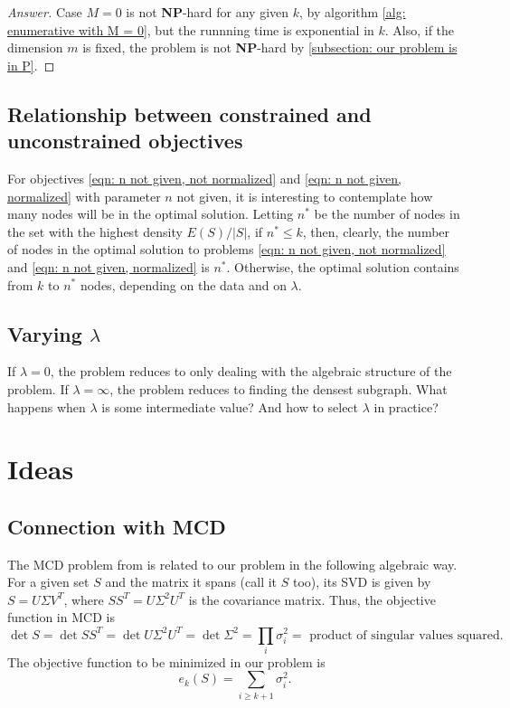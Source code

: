\documentclass{article}
\begin{document}
\begin{proof}[Answer]
Case $M=0$ is not \textbf{NP}-hard for any given $k$, by algorithm \ref{alg: enumerative with M = 0}, but the runnning time is exponential in $k$. Also, if the dimension $m$ is fixed, the problem is not \textbf{NP}-hard by \ref{subsection: our problem is in P}.
\end{proof}

\subsection{Relationship between constrained and unconstrained objectives}
For objectives \ref{eqn: n not given, not normalized} and \ref{eqn: n not given, normalized} with parameter $n$ not given, it is interesting to contemplate how many nodes will be in the optimal solution. Letting $n^*$ be the number of nodes in the set with the highest density $E(S)/|S|$,
if $n^* \leq k$, then, clearly, the number of nodes in the optimal solution to problems \ref{eqn: n not given, not normalized} and \ref{eqn: n not given, normalized} is $n^*$. Otherwise, the optimal solution contains from $k$ to $n^*$ nodes, depending on the data and on $\lambda$.

\subsection{Varying $\lambda$}
If $\lambda = 0$, the problem reduces to only dealing with the algebraic structure of the problem. If $\lambda = \infty$, the problem reduces to finding the densest subgraph. What happens when $\lambda$ is some intermediate value? And how to select $\lambda$ in practice?

\section{Ideas}
\subsection{Connection with MCD}
The MCD problem from \cite{bernholt2004complexity} is related to our problem in the following algebraic way. For a given set $S$ and the matrix it spans (call it $S$ too), its SVD is given by $S = U \Sigma V^T$, where $SS^T = U \Sigma^2 U^T$ is the covariance matrix. Thus, the objective function in MCD is $$\det{S} = \det{SS^T} = \det{U \Sigma^2 U^T} = \det{\Sigma^2} = \prod_{i}\sigma_i^2 = \text{ product of singular values squared}.$$ The objective function to be minimized in our problem is $$e_k(S) = \sum_{i \geq k+1}\sigma_i^2.$$
\end{document}
